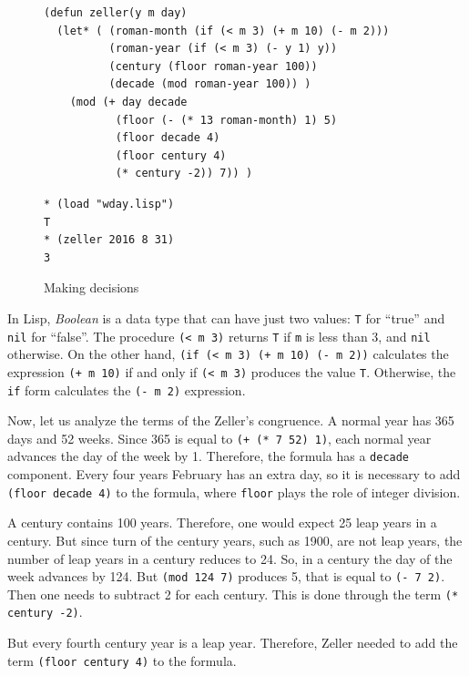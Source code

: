 \documentclass[a4paper,12pt]{book}
\newenvironment{fmpage}[1]
           {\begin{lrbox}{\fmbox}\begin{minipage}{#1}}
           {\end{minipage}\end{lrbox}\fbox{\usebox{\fmbox}}}
\begin{document}
\begin{figure}[!b]
\begin{fmpage}{0.9\linewidth}
\begin{verbatim}
(defun zeller(y m day)
  (let* ( (roman-month (if (< m 3) (+ m 10) (- m 2)))
          (roman-year (if (< m 3) (- y 1) y))
          (century (floor roman-year 100))
          (decade (mod roman-year 100)) )
    (mod (+ day decade
           (floor (- (* 13 roman-month) 1) 5)
           (floor decade 4)
           (floor century 4)
           (* century -2)) 7)) )
\end{verbatim}
\end{fmpage}

\begin{fmpage}{0.9\linewidth}
\begin{verbatim}
* (load "wday.lisp")
T
* (zeller 2016 8 31)
3
\end{verbatim}
\end{fmpage}
\caption{Making decisions}
\label{fig:zeller}
\end{figure}

In Lisp, {\em Boolean} is a data type
that can have just two values: \verb|T|
for ``true'' and \verb|nil| for ``false''.
The procedure \verb|(< m 3)| returns
\verb|T| if \verb|m| is less than 3,
and \verb|nil| otherwise. On the other
hand, \verb|(if (< m 3) (+ m 10) (- m 2))|
calculates the expression \verb|(+ m 10)|
if and only if \verb|(< m 3)| produces
the value \verb|T|. Otherwise, the
\verb|if| form calculates the \verb|(- m 2)|
expression.

Now, let us analyze the terms of the Zeller's
congruence. A normal year has 365 days and 52 weeks.
Since 365 is equal to \verb|(+ (* 7 52) 1)|, each
normal year advances the day of the week by 1.
Therefore, the formula has a \verb|decade| component.
Every four years February has an extra day, so it is
necessary to add \verb|(floor decade 4)| to the formula,
where \verb|floor| plays the role of integer division.

A century contains 100 years. Therefore, one would
expect  25 leap years in a century. But since turn
of the century years, such as 1900, are not leap
years, the number of leap years in a century reduces
to 24. So, in a century the day of the week advances
by 124. But \verb|(mod 124 7)| produces 5, that is
equal to \verb|(- 7 2)|. Then one needs to subtract 2
for each century. This is done through the
term \verb|(* century -2)|.

But every fourth century year is a leap year. Therefore,
Zeller needed to  add the term \verb|(floor century 4)|
to the formula.
\end{document}
